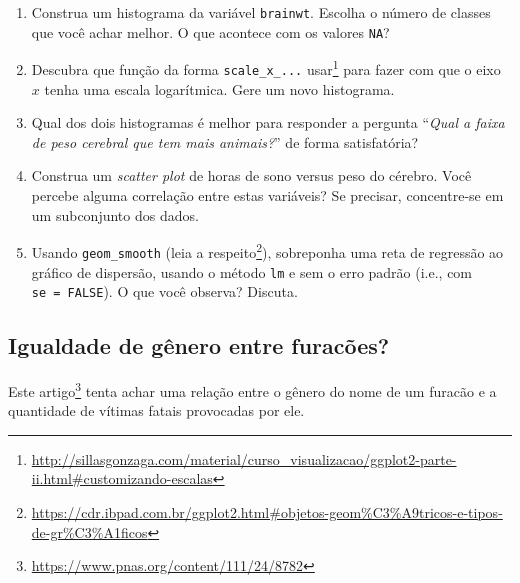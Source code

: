 \documentclass[
  11pt]{report}
\DeclareRobustCommand{\href}[2]{#2\footnote{\url{#1}}}
\begin{document}
\begin{enumerate}
\def\labelenumi{\arabic{enumi}.}
\item
  Construa um histograma da variável \texttt{brainwt}. Escolha o número de classes que você achar melhor. O que acontece com os valores \texttt{NA}?
\item
  \href{http://sillasgonzaga.com/material/curso_visualizacao/ggplot2-parte-ii.html\#customizando-escalas}{Descubra que função da forma \texttt{scale\_x\_...} usar} para fazer com que o eixo $x$ tenha uma escala logarítmica. Gere um novo histograma.
\item
  Qual dos dois histogramas é melhor para responder a pergunta ``\emph{Qual a faixa de peso cerebral que tem mais animais?}'' de forma satisfatória?
\item
  Construa um \emph{scatter plot} de horas de sono versus peso do cérebro. Você percebe alguma correlação entre estas variáveis? Se precisar, concentre-se em um subconjunto dos dados.
\item
  Usando \texttt{geom\_smooth} (\href{https://cdr.ibpad.com.br/ggplot2.html\#objetos-geom\%C3\%A9tricos-e-tipos-de-gr\%C3\%A1ficos}{leia a respeito}), sobreponha uma reta de regressão ao gráfico de dispersão, usando o método \texttt{lm} e sem o erro padrão (i.e., com \texttt{se\ =\ FALSE}). O que você observa? Discuta.
\end{enumerate}

\hypertarget{igualdade-de-guxeanero-entre-furacuxf5es}{%
\subsection{Igualdade de gênero entre furacões?}\label{igualdade-de-guxeanero-entre-furacuxf5es}}

\href{https://www.pnas.org/content/111/24/8782}{Este artigo} tenta achar uma relação entre o gênero do nome de um furacão e a quantidade de vítimas fatais provocadas por ele.
\end{document}
